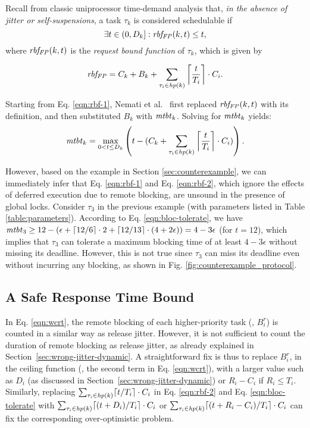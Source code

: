 Recall from classic uniprocessor time-demand analysis \cite{lehoczky-1989} that, \emph{in the absence of jitter or self-suspensions}, a task $\tau_k$ is considered schedulable if
\begin{equation}
\label{eqn:rbf-1}
\exists t \in (0,D_k]: \mathit{rbf_{FP}}(k,t) \leq t, 
\end{equation}
where $\mathit{rbf_{FP}}(k,t)$ is the \emph{request bound function} of $\tau_k$, which is given by

\begin{equation}
\label{eqn:rbf-2}
\mathit{rbf_{FP}} = C_k + B_k + \sum_{\tau_i \in \mathit{hp}(k)} \left \lceil \frac{t}{T_i} \right \rceil \cdot C_i.
\end{equation}

Starting from Eq. \eqref{eqn:rbf-1}, Nemati et al.~\cite{NBN:11} first  replaced $\mathit{rbf_{FP}}(k,t)$ with its definition, and then substituted  $B_k$ with $\mathit{mtbt}_k$. Solving for $\mathit{mtbt}_k$ yields:
\begin{equation}
\label{eqn:bloc-tolerate}
\mathit{mtbt}_k = \max_{0<t \leq D_k} \left( t - ( C_k + \sum_{\tau_i \in \mathit{hp}(k)} \left \lceil \frac{t}{T_i} \right \rceil \cdot C_i ) \right).
\end{equation}

However, based on the example in Section \ref{sec:counterexample}, we can immediately infer that Eq. \eqref{eqn:rbf-1} and Eq. \eqref{eqn:rbf-2}, which ignore the effects of deferred execution due to remote blocking, are unsound in the presence of global locks. Consider $\tau_3$ in the previous example (with parameters listed in Table \ref{table:parameters}). According to Eq. \eqref{eqn:bloc-tolerate}, we have $\mathit{mtbt}_3 \geq 12 - (\epsilon + \lceil 12 / 6 \rceil \cdot 2 + \lceil 12 / 13 \rceil \cdot (4+2\epsilon)) = 4-3\epsilon$ (for $t=12$), which implies that $\tau_3$ can tolerate a maximum blocking time of at least $4-3\epsilon$ without missing its deadline. However, this is not true since $\tau_3$ can miss its deadline even without incurring any blocking, as shown in Fig. \ref{fig:counterexample_protocol}. 

\subsection{A Safe Response Time Bound}
\label{sec:safe_bound}

In Eq. \eqref{eqn:wcrt}, the remote blocking of each higher-priority task (\ie, $B_i^r$) is counted in a similar way as release jitter. However, it is not sufficient to count the duration of remote blocking as release jitter, as already explained in Section~\ref{sec:wrong-jitter-dynamic}. A straightforward fix is thus to replace $B_i^r$, in the ceiling function (\ie, the second term in Eq. \eqref{eqn:wcrt}), with a larger value such as $D_i$ (as discussed in Section~\ref{sec:wrong-jitter-dynamic}) or $R_i - C_i$ if $R_i \leq T_i$. Similarly, replacing $\sum_{\tau_i \in \mathit{hp}(k)} \lceil t / T_i \rceil \cdot C_i$ in Eq. \eqref{eqn:rbf-2} and Eq. \eqref{eqn:bloc-tolerate} with $\sum_{\tau_i \in \mathit{hp}(k)} \lceil (t+D_i) / T_i \rceil \cdot C_i$ or $\sum_{\tau_i \in \mathit{hp}(k)} \lceil (t+R_i-C_i) / T_i \rceil \cdot C_i$ can fix the corresponding over-optimistic problem.

